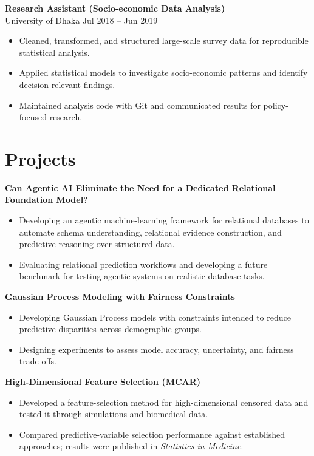 \documentclass[10pt, letterpaper]{article}
\begin{document}
\textbf{Research Assistant (Socio-economic Data Analysis)} \\
University of Dhaka \hfill Jul 2018 -- Jun 2019
\begin{itemize}
    \item Cleaned, transformed, and structured large-scale survey data for reproducible statistical analysis.
    \item Applied statistical models to investigate socio-economic patterns and identify decision-relevant findings.
    \item Maintained analysis code with Git and communicated results for policy-focused research.
\end{itemize}

    
    \section*{Projects}
    \textbf{Can Agentic AI Eliminate the Need for a Dedicated Relational Foundation Model?}
    \begin{itemize}
        \item Developing an agentic machine-learning framework for relational databases to automate schema understanding, relational evidence construction, and predictive reasoning over structured data.
        \item Evaluating relational prediction workflows and developing a future benchmark for testing agentic systems on realistic database tasks.
    \end{itemize}

    \textbf{Gaussian Process Modeling with Fairness Constraints} \\
    \begin{itemize}
    \item Developing Gaussian Process models with constraints intended to reduce predictive disparities across demographic groups.
    \item Designing experiments to assess model accuracy, uncertainty, and fairness trade-offs.
    \end{itemize}

    \textbf{High-Dimensional Feature Selection (MCAR)} \\
    \begin{itemize}
    \item Developed a feature-selection method for high-dimensional censored data and tested it through simulations and biomedical data.
    \item Compared predictive-variable selection performance against established approaches; results were published in \textit{Statistics in Medicine}.
\end{itemize}
\end{document}
